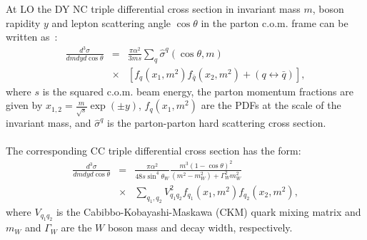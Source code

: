 
At LO  the DY NC triple differential cross section in invariant mass \(m\), boson rapidity \(y\) 
and lepton scattering angle \(\cos\theta\) in the parton c.o.m. frame can be written as~\cite{Drell:1970wh,Yamada:1981mw}:
\begin{eqnarray}
 \frac{d^3\sigma}{dm{d}y d\cos\theta} &=&  
 \frac{\pi\alpha^2}{3ms}\sum\limits_{q}\hat{\sigma}^{q}(\cos\theta, m)  \nonumber \\
 &\times &\left[f_q(x_1,m^2)f_{\bar{q}}(x_2,m^2) 
 + (q\leftrightarrow\bar{q})\right],
\end{eqnarray}
where \(s\) is the squared c.o.m. beam energy, the parton momentum fractions are given by \(x_{1,2} = \frac{m}{\sqrt{s}}\exp(\pm y)\), $f_q(x_1,m^2)$ 
are the PDFs at the scale of the invariant mass, and 
$\hat{\sigma}^{q}$ is the parton-parton hard scattering cross section. 
%
\\
\\
The corresponding CC triple differential cross section has the form:
\begin{eqnarray}
\frac{d^3\sigma}{dmdyd\cos\theta} &=&
 \frac{\pi\alpha^2}{48s\sin^4\theta_W}
 \frac{m^3(1-\cos\theta)^2}{(m^2-m_W^2)+\Gamma_W^2m_W^2}  \nonumber \\
 &\times& \sum_{q_1,q_2}V_{q_1q_2}^2f_{q_1}(x_1,m^2)f_{q_2}(x_2,m^2),
\end{eqnarray}
where \(V_{q_1q_2}\) is the Cabibbo-Kobayashi-Maskawa (CKM) quark mixing matrix and \(m_W\) and \(\Gamma_W\)
are the \(W\) boson mass and decay width, respectively.

